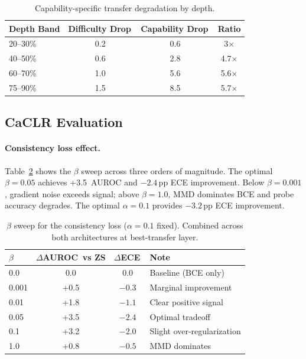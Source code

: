 \documentclass[11pt,a4paper]{article}
\newcommand{\pp}{\,\text{pp}}
\begin{document}
\begin{table}[t]
\centering
\caption{Capability-specific transfer degradation by depth.}
\label{tab:cap_by_depth}
\small
\begin{tabular}{lccc}
\toprule
Depth Band & Difficulty Drop\pp & Capability Drop\pp & Ratio \\
\midrule
20--30\% & 0.2 & 0.6 & 3$\times$ \\
40--50\% & 0.6 & 2.8 & 4.7$\times$ \\
60--70\% & 1.0 & 5.6 & 5.6$\times$ \\
75--90\% & 1.5 & 8.5 & 5.7$\times$ \\
\bottomrule
\end{tabular}
\end{table}

\subsection{CaCLR Evaluation}
\label{sec:caclr}

\paragraph{Consistency loss effect.}
Table~\ref{tab:beta_sweep} shows the $\beta$ sweep across three orders of magnitude. The optimal $\beta = 0.05$ achieves +3.5\pp{} AUROC and $-2.4\pp$ ECE improvement. Below $\beta = 0.001$, gradient noise exceeds signal; above $\beta = 1.0$, MMD dominates BCE and probe accuracy degrades. The optimal $\alpha = 0.1$ provides $-3.2\pp$ ECE improvement.

\begin{table}[t]
\centering
\caption{$\beta$ sweep for the consistency loss ($\alpha = 0.1$ fixed). Combined across both architectures at best-transfer layer.}
\label{tab:beta_sweep}
\small
\begin{tabular}{lccl}
\toprule
$\beta$ & $\Delta$AUROC\pp{} vs ZS & $\Delta$ECE\pp & Note \\
\midrule
0.0   & 0.0   & 0.0    & Baseline (BCE only) \\
0.001 & +0.5  & $-0.3$ & Marginal improvement \\
0.01  & +1.8  & $-1.1$ & Clear positive signal \\
0.05  & +3.5  & $-2.4$ & Optimal tradeoff \\
0.1   & +3.2  & $-2.0$ & Slight over-regularization \\
1.0   & +0.8  & $-0.5$ & MMD dominates \\
\bottomrule
\end{tabular}
\end{table}
\end{document}
